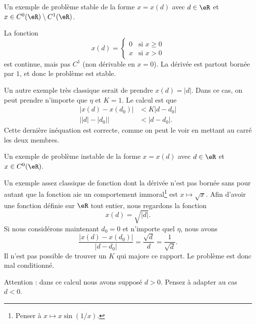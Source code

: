 \begin{example} \label{ExRZrOeoi}
	Un exemple de problème stable de la forme  $x=x(d)$ avec $d\in\eR$ et $x \in C^0(\eR)\setminus C^1(\eR)$.

	La fonction
	\begin{equation}
		x(d)=\begin{cases}
			0   &   \text{si $x\geq 0$}\\
			x   &   \text{si $x>0$}
		\end{cases}
	\end{equation}
	est continue, mais pas $C^1$ (non dérivable en $x=0$). La dérivée est partout bornée par $1$, et donc le problème est stable.

	Un autre exemple très classique serait de prendre $x(d)=| d |$. Dans ce cas, on peut prendre n'importe que $\eta$ et $K=1$. Le calcul est que
	\begin{subequations}
		\begin{align}
			| x(d)-x(d_0) |&<K| d-d_0 |\\
			\big| | d |-| d_0 | \big|&<| d-d_0 |.
		\end{align}
	\end{subequations}
	Cette dernière inéquation est correcte, comme on peut le voir en mettant au carré les deux membres.

\end{example}

\begin{example} \label{PIluknK}
	Un exemple de problème instable de la forme $x=x(d)$ avec $d\in\eR$ et $x \in C^0(\eR)$.

	Un exemple assez classique de fonction dont la dérivée n'est pas bornée sans pour autant que la fonction aie un comportement immoral\footnote{Penser à $x\mapsto x\sin(1/x)$.} est $x\mapsto\sqrt{x}$. Afin d'avoir une fonction définie sur $\eR$ tout entier, nous regardons la fonction
	\begin{equation}
		x(d)=\sqrt{|d|}.
	\end{equation}
	Si nous considérons maintenant $d_0=0$ et n'importe quel $\eta$, nous avons
	\begin{equation}
		\frac{ | x(d)-x(d_0) | }{ | d-d_0 | }=\frac{ \sqrt{d} }{ d }=\frac{1}{ \sqrt{d} }.
	\end{equation}
	Il n'est pas possible de trouver un $K$ qui majore ce rapport. Le problème est donc mal conditionné.

	Attention : dans ce calcul nous avons supposé $d>0$. Pensez à adapter au cas $d<0$.
\end{example}

